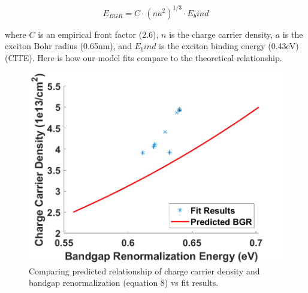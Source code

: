 \documentclass[aps,prl,preprint,superscriptaddress]{revtex4-2}
\begin{document}
\begin{equation}
E_{BGR} = C \cdot (n a^2)^{1/3} \cdot E_bind
\end{equation}

where $C$ is an empirical front factor (2.6), $n$ is the charge carrier density, $a$ is the exciton Bohr radius (0.65nm), and $E_bind$ is the exciton binding energy (0.43eV) (CITE). Here is how our model fits compare to the theoretical relationship.

\begin{figure}[H]
	\begin{centering}
	\includegraphics[width=0.5\linewidth]{fig_nvsBGR.png}
	\caption{Comparing predicted relationship of charge carrier density and bandgap renormalization (equation 8) vs fit results.}
	\label{fig:nvsBGR}
	\end{centering}
\end{figure}



%

\end{document}
